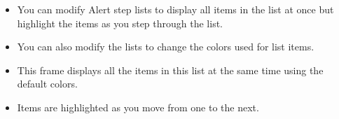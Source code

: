 \documentclass[notes=show,beamer]{beamer}
\makeatletter
\newenvironment{stepitemizewithalert}{\begin{itemize}[<+-| alert@+>]}{\end{itemize} }
\makeatother
\begin{document}
\renewenvironment{stepitemizewithalert}{\begin{itemize}[<0-| alert@+>]}{\end{itemize} }%

\begin{frame}%



\begin{stepitemizewithalert}
\item You can modify Alert step lists to display all items in the list at
once but highlight the items as you step through the list.

\item You can also modify the lists to change the colors used for list items.

\item This frame displays all the items in this list at the same time using
the default colors.

\item Items are highlighted as you move from one to the next.
\end{stepitemizewithalert}

\end{frame}%

\renewenvironment{stepitemizewithalert}{\begingroup\begin{itemize}[<0-| alert@+>]
\setbeamercolor{alerted text}{fg=black}
\setbeamercolor{unhighlighted text}{fg=black!40}\usebeamercolor[fg]{unhighlighted text}
}{\end{itemize}\endgroup }%
\end{document}
